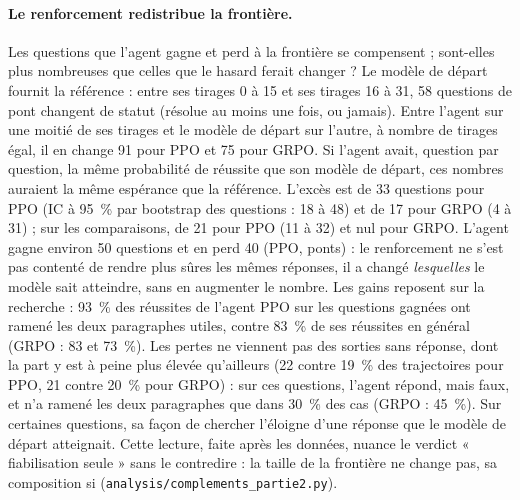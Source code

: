 \paragraph{Le renforcement redistribue la frontière.} Les questions que l'agent gagne et perd à la frontière se compensent ; sont-elles plus nombreuses que celles que le hasard ferait changer ? Le modèle de départ fournit la référence : entre ses tirages 0 à 15 et ses tirages 16 à 31, 58 questions de pont changent de statut (résolue au moins une fois, ou jamais). Entre l'agent sur une moitié de ses tirages et le modèle de départ sur l'autre, à nombre de tirages égal, il en change 91 pour PPO et 75 pour GRPO. Si l'agent avait, question par question, la même probabilité de réussite que son modèle de départ, ces nombres auraient la même espérance que la référence. L'excès est de 33 questions pour PPO (IC à 95~\% par bootstrap des questions : 18 à 48) et de 17 pour GRPO (4 à 31) ; sur les comparaisons, de 21 pour PPO (11 à 32) et nul pour GRPO. L'agent gagne environ 50 questions et en perd 40 (PPO, ponts) : le renforcement ne s'est pas contenté de rendre plus sûres les mêmes réponses, il a changé \emph{lesquelles} le modèle sait atteindre, sans en augmenter le nombre. Les gains reposent sur la recherche : 93~\% des réussites de l'agent PPO sur les questions gagnées ont ramené les deux paragraphes utiles, contre 83~\% de ses réussites en général (GRPO : 83 et 73~\%). Les pertes ne viennent pas des sorties sans réponse, dont la part y est à peine plus élevée qu'ailleurs (22 contre 19~\% des trajectoires pour PPO, 21 contre 20~\% pour GRPO) : sur ces questions, l'agent répond, mais faux, et n'a ramené les deux paragraphes que dans 30~\% des cas (GRPO : 45~\%). Sur certaines questions, sa façon de chercher l'éloigne d'une réponse que le modèle de départ atteignait. Cette lecture, faite après les données, nuance le verdict « fiabilisation seule » sans le contredire : la taille de la frontière ne change pas, sa composition si (\texttt{analysis/complements\_partie2.py}).

